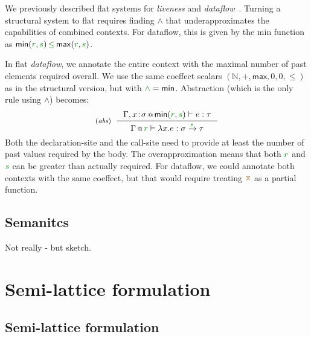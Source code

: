 \begin{remark}
We previously described flat systems for \emph{liveness} and \emph{dataflow}~\cite{petricek2013coeffects}.
Turning a structural system to flat requires finding $\wedge$ that 
underapproximates the capabilities of combined contexts. For dataflow, this is given by the \textsf{min} function as
$\mathsf{min}(\cclrd{r},\cclrd{s}) \,\cleq\, \mathsf{max}(\cclrd{r},\cclrd{s})$.

In flat \emph{dataflow}, we annotate the
entire context with the maximal number of past elements required
overall. We use the same coeffect scalars $(\mathbb{N}, +, \mathsf{max}, 0, 0, \leq)$
as in the structural version, but with
$\cclrd{\wedge} = \ident{min}$. Abstraction (which is the only rule using $\wedge$) becomes:
\[
\tyrule{abs}
  { \coctx{\Gamma, x\!:\!\sigma}{\ident{min}(\cclrd{r}, \cclrd{s})} \vdash e : \tau }
  { \coctx{\Gamma}{\cclrd{r}} \vdash \lambda x . e : \sigma \xrightarrow{\cclrd{s}} \tau }
\]
Both the declaration-site and the call-site need to provide at least
the number of past values required by the body. The overapproximation means that both $\cclrd{r}$
and $\cclrd{s}$ can be greater than actually required.
For dataflow, we could annotate
both contexts with the same coeffect,
but that would require treating $\azip$ as a partial function.
\end{remark}

\subsection{Semanitcs}
\label{sec:unified-semantics}

Not really - but sketch.


\section{Semi-lattice formulation}
\label{sec:unified-semilattice}

\subsection{Semi-lattice formulation}


